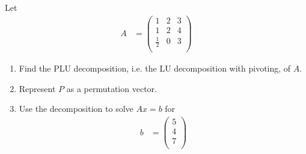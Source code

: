 \documentclass[fleqn, a4paper, 12pt, twoside]{article}
\theoremstyle{definition}
\theoremstyle{theorem}
\begin{document}
\begin{question}
	Let
	\begin{align*}
		A &=
			\begin{pmatrix}
				1           & 2 & 3 \\
				1           & 2 & 4 \\
				\frac{1}{2} & 0 & 3 \\
			\end{pmatrix}
	\end{align*}
	\begin{enumerate}
		\item
			Find the PLU decomposition, i.e. the LU decomposition with pivoting, of $A$.
		\item
			Represent $P$ as a permutation vector.
		\item
			Use the decomposition to solve ${A x = b}$ for
			\begin{align*}
				b &=
					\begin{pmatrix}
						5 \\
						4 \\
						7 \\
					\end{pmatrix}
			\end{align*}
	\end{enumerate}
\end{question}
\end{document}
